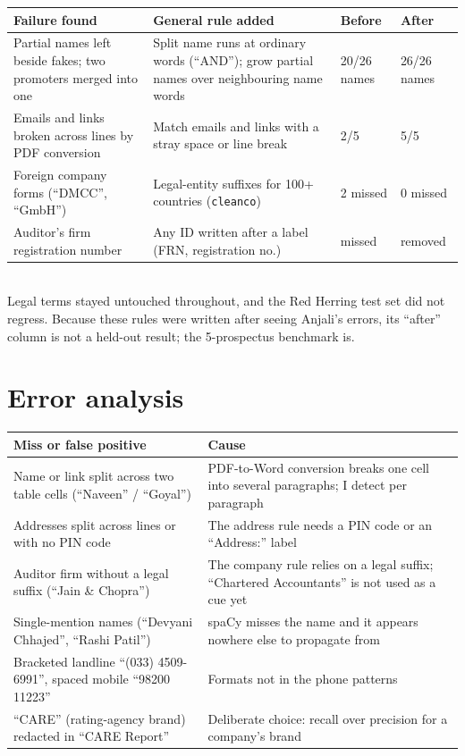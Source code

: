 \documentclass[11pt,a4paper]{article}
\begin{document}
\begin{tabularx}{\textwidth}{@{}LLP{1.6cm}P{1.6cm}@{}}
\toprule
\textbf{Failure found} & \textbf{General rule added} & \textbf{Before} & \textbf{After} \\
\midrule
Partial names left beside fakes; two promoters merged into one & Split name runs at ordinary words (``AND''); grow partial names over neighbouring name words & 20/26 names & 26/26 names \\
Emails and links broken across lines by PDF conversion & Match emails and links with a stray space or line break & 2/5 & 5/5 \\
Foreign company forms (``DMCC'', ``GmbH'') & Legal-entity suffixes for 100+ countries (\texttt{cleanco}) & 2 missed & 0 missed \\
Auditor's firm registration number & Any ID written after a label (FRN, registration no.) & missed & removed \\
\bottomrule
\end{tabularx}\\[2pt]
{\small Legal terms stayed untouched throughout, and the Red Herring test set did not regress. Because these rules were written after seeing Anjali's errors, its ``after'' column is not a held-out result; the 5-prospectus benchmark is.}

\section{Error analysis}
\begin{tabularx}{\textwidth}{@{}P{5.2cm}L@{}}
\toprule
\textbf{Miss or false positive} & \textbf{Cause} \\
\midrule
Name or link split across two table cells (``Naveen'' / ``Goyal'') & PDF-to-Word conversion breaks one cell into several paragraphs; I detect per paragraph \\
Addresses split across lines or with no PIN code & The address rule needs a PIN code or an ``Address:'' label \\
Auditor firm without a legal suffix (``Jain \& Chopra'') & The company rule relies on a legal suffix; ``Chartered Accountants'' is not used as a cue yet \\
Single-mention names (``Devyani Chhajed'', ``Rashi Patil'') & spaCy misses the name and it appears nowhere else to propagate from \\
Bracketed landline ``(033) 4509-6991'', spaced mobile ``98200 11223'' & Formats not in the phone patterns \\
``CARE'' (rating-agency brand) redacted in ``CARE Report'' & Deliberate choice: recall over precision for a company's brand \\
\bottomrule
\end{tabularx}
\end{document}
